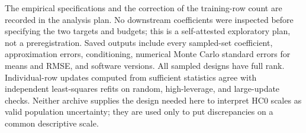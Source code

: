 \documentclass[11pt]{article}
\begin{document}
The empirical specifications and the correction of the training-row count are
recorded in the analysis plan. No downstream coefficients were inspected before
specifying the two targets and budgets; this is a self-attested exploratory
plan, not a preregistration. Saved outputs include every sampled-set coefficient,
approximation errors, conditioning, numerical Monte Carlo standard errors for
means and RMSE, and software versions. All sampled designs have full rank.
Individual-row updates computed from sufficient statistics agree with independent
least-squares refits on random, high-leverage, and large-update checks. Neither
archive supplies the design needed here to interpret HC0 scales as valid
population uncertainty; they are used only to put discrepancies on a common
descriptive scale.
\end{document}
